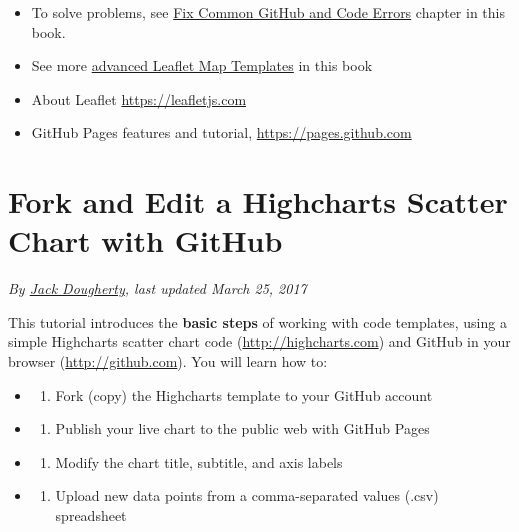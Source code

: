 \documentclass[
  english,
]{book}
\providecommand{\tightlist}{%
  \setlength{\itemsep}{0pt}\setlength{\parskip}{0pt}}
\begin{document}
\begin{itemize}
\tightlist
\item
  To solve problems, see \href{fix-code}{Fix Common GitHub and Code Errors} chapter in this book.
\item
  See more \href{leaflet}{advanced Leaflet Map Templates} in this book
\item
  About Leaflet \url{https://leafletjs.com}
\item
  GitHub Pages features and tutorial, \url{https://pages.github.com}
\end{itemize}

\hypertarget{fork-highcharts}{%
\section{Fork and Edit a Highcharts Scatter Chart with GitHub}\label{fork-highcharts}}

\emph{By \href{author}{Jack Dougherty}, last updated March 25, 2017}

This tutorial introduces the \textbf{basic steps} of working with code templates, using a simple Highcharts scatter chart code (\url{http://highcharts.com}) and GitHub in your browser (\url{http://github.com}). You will learn how to:

\begin{itemize}
\item
  \begin{enumerate}
  \def\labelenumi{\Alph{enumi})}
  \tightlist
  \item
    Fork (copy) the Highcharts template to your GitHub account
  \end{enumerate}
\item
  \begin{enumerate}
  \def\labelenumi{\Alph{enumi})}
  \setcounter{enumi}{1}
  \tightlist
  \item
    Publish your live chart to the public web with GitHub Pages
  \end{enumerate}
\item
  \begin{enumerate}
  \def\labelenumi{\Alph{enumi})}
  \setcounter{enumi}{2}
  \tightlist
  \item
    Modify the chart title, subtitle, and axis labels
  \end{enumerate}
\item
  \begin{enumerate}
  \def\labelenumi{\Alph{enumi})}
  \setcounter{enumi}{3}
  \tightlist
  \item
    Upload new data points from a comma-separated values (.csv) spreadsheet
  \end{enumerate}
\end{itemize}
\end{document}
